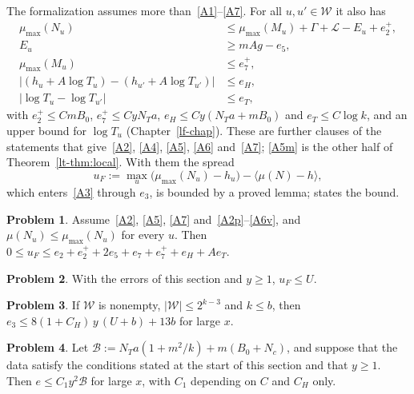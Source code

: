 \documentclass[reqno]{amsart}
\newcounter{chap}
\theoremstyle{definition}
\newtheorem{problem}{Problem}[section]
\theoremstyle{plain}
\newcommand{\Lc}{\mathcal{L}}
\newcommand{\Bc}{\mathcal{B}}
\newcommand{\Wc}{\mathcal{W}}
\newcommand{\mumax}{\mu_{\max}}
\begin{document}
The formalization assumes more than~\eqref{A1}--\eqref{A7}.  For all \(u, u' \in \Wc\) it also has
\begin{align}
  \mumax(N_u) &\le \mumax(M_u) + \Gamma + \Lc - E_u + e_2^+ , \tag{A2\(^+\)}\label{A2p}\\
  E_u &\ge mAg - e_5 , \tag{A5\(^-\)}\label{A5m}\\
  \mumax(M_u) &\le e_7^+ , \tag{A7\(^+\)}\label{A7p}\\
  \bigl\lvert (h_u + A\log T_u) - (h_{u'} + A\log T_{u'}) \bigr\rvert &\le e_H , \tag{H}\label{H}\\
  \lvert \log T_u - \log T_{u'} \rvert &\le e_T , \tag{A6\('\)}\label{A6v}
\end{align}
with \(e_2^+ \le CmB_0\), \(e_7^+ \le CyN_Ta\), \(e_H \le Cy(N_Ta + mB_0)\) and \(e_T \le C\log k\), and an upper bound for \(\log T_u\) (Chapter~\ref{lf-chap}).  These are further clauses of the statements that give~\eqref{A2}, \eqref{A4}, \eqref{A5}, \eqref{A6} and~\eqref{A7}; \eqref{A5m} is the other half of Theorem~\ref{lt-thm:local}.  With them the spread
\[
  u_F := \max_u\bigl(\mumax(N_u) - h_u\bigr) - \langle\mu(N) - h\rangle ,
\]
which enters~\eqref{A3} through \(e_3\), is bounded by a proved lemma; \cite[Lemma~18.13]{Adr} states the bound.

\begin{problem}\label{pr:spread}
Assume~\eqref{A2}, \eqref{A5}, \eqref{A7} and~\eqref{A2p}--\eqref{A6v}, and \(\mu(N_u) \le \mumax(N_u)\) for every \(u\).  Then \(0 \le u_F \le e_2 + e_2^+ + 2e_5 + e_7 + e_7^+ + e_H + Ae_T\).
\end{problem}

\begin{problem}\label{pr:spread-size}
With the errors of this section and \(y \ge 1\), \(u_F \le U\).
\end{problem}

\begin{problem}\label{pr:e3}
If \(\Wc\) is nonempty, \(\lvert\Wc\rvert \le 2^{k-3}\) and \(k \le b\), then \(e_3 \le 8(1 + C_H)\,y\,(U + b) + 13b\) for large \(x\).
\end{problem}

\begin{problem}\label{pr:calB}
Let \(\Bc := N_Ta(1 + m^2/k) + m(B_0 + N_c)\), and suppose that the data satisfy the conditions stated at the start of this section and that \(y \ge 1\).  Then \(e \le C_1y^2\Bc\) for large \(x\), with \(C_1\) depending on \(C\) and \(C_H\) only.
\end{problem}
\end{document}
